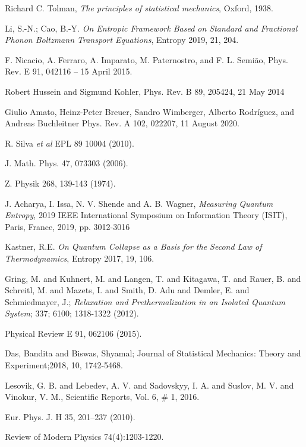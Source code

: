 \documentclass{article}
\begin{document}
\begin{thebibliography}{}
 Richard C. Tolman, \emph{The principles of statistical mechanics}, Oxford, 1938.

Li, S.-N.; Cao, B.-Y. {\it On Entropic Framework Based on Standard and Fractional Phonon Boltzmann Transport Equations}, Entropy 2019, 21, 204.


F. Nicacio, A. Ferraro, A. Imparato, M. Paternostro, and F. L. Semião,
Phys. Rev. E 91, 042116 – 15 April 2015.

Robert Hussein and Sigmund Kohler,
Phys. Rev. B 89, 205424, 21 May 2014

Giulio Amato, Heinz-Peter Breuer, Sandro Wimberger, Alberto Rodríguez, and Andreas Buchleitner
Phys. Rev. A 102, 022207, 11 August 2020.

R. Silva {\it et al} EPL 89 10004 (2010).

J. Math. Phys. 47, 073303 (2006).

Z. Physik 268, 139-143 (1974).

J. Acharya, I. Issa, N. V. Shende and A. B. Wagner, {\it Measuring Quantum Entropy}, 2019 IEEE International Symposium on Information Theory (ISIT), Paris, France, 2019, pp. 3012-3016

Kastner, R.E. {\it On Quantum Collapse as a Basis for the Second Law of Thermodynamics}, Entropy 2017, 19, 106.



Gring, M. and Kuhnert, M. and Langen, T. and Kitagawa, T. and Rauer, B. and Schreitl, M. and Mazets, I. and Smith, D. Adu and Demler, E. and Schmiedmayer, J.; {\it Relaxation and Prethermalization in an Isolated Quantum System}; 337; 6100; 1318-1322 (2012).

Physical Review E 91, 062106 (2015).




Das, Bandita and Biswas, Shyamal; Journal of Statistical Mechanics: Theory and Experiment;2018, 10, 1742-5468. 

Lesovik, G. B. and Lebedev, A. V. and Sadovskyy, I. A. and Suslov, M. V. and Vinokur, V. M., Scientific Reports, Vol. 6, \# 1, 2016.

Eur. Phys. J. H 35, 201–237 (2010).

Review of Modern Physics 74(4):1203-1220.




\end{thebibliography}{}
\end{document}
